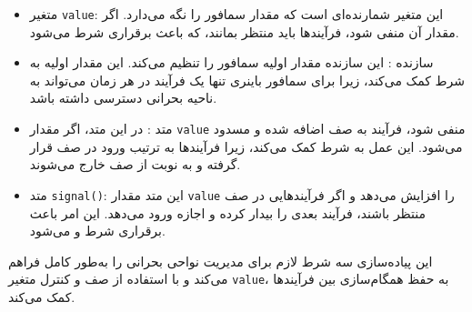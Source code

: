 \begin{qsolve}
	
	\begin{itemize}
		\item متغیر \texttt{value}: این متغیر شمارنده‌ای است که مقدار سمافور را نگه می‌دارد. اگر مقدار آن منفی شود، فرآیندها باید منتظر بمانند، که باعث برقراری شرط  می‌شود.
		
		\item سازنده : این سازنده مقدار اولیه سمافور را تنظیم می‌کند. این مقدار اولیه به شرط  کمک می‌کند، زیرا برای سمافور باینری تنها یک فرآیند در هر زمان می‌تواند به ناحیه بحرانی دسترسی داشته باشد.
		
		\item متد : در این متد، اگر مقدار \texttt{value} منفی شود، فرآیند به صف اضافه شده و مسدود می‌شود. این عمل به شرط  کمک می‌کند، زیرا فرآیندها به ترتیب ورود در صف قرار گرفته و به نوبت از صف خارج می‌شوند.
		
		\item متد \texttt{\texttt{signal()}}: این متد مقدار \texttt{value} را افزایش می‌دهد و اگر فرآیندهایی در صف منتظر باشند، فرآیند بعدی را بیدار کرده و اجازه ورود می‌دهد. این امر باعث برقراری شرط  و  می‌شود.
	\end{itemize}
	
	این پیاده‌سازی سه شرط لازم برای مدیریت نواحی بحرانی را به‌طور کامل فراهم می‌کند و با استفاده از صف و کنترل متغیر \texttt{value}، به حفظ همگام‌سازی بین فرآیندها کمک می‌کند.
	
\end{qsolve}